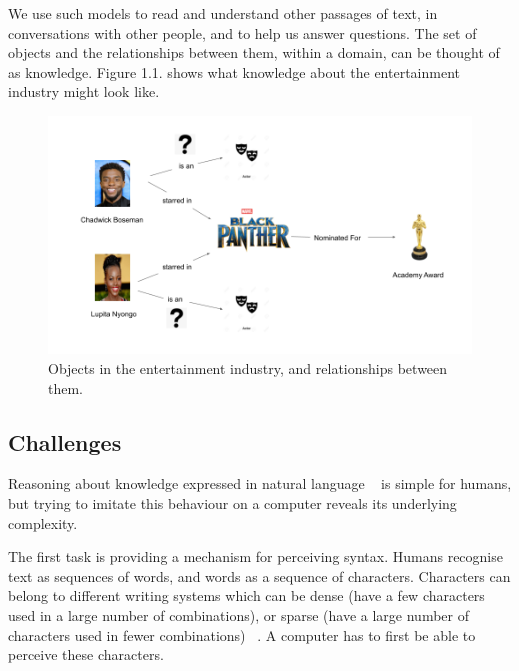 \noindent We use such models to read and understand other passages of text, in conversations with other people, and to help us answer questions. The set of objects and the relationships between them, within a domain, can be thought of as knowledge. Figure 1.1. shows what knowledge about the entertainment industry might look like. \newline

\begin{figure}
   	\centering
    	\includegraphics[width=\textwidth]{Objects_and_the_Relationships_Between_Them}
	\caption{Objects in the entertainment industry, and relationships between them.}
\end{figure}

\subsection{Challenges} 

Reasoning about knowledge expressed in natural language \unskip~\citep{minervini2019differentiable} is simple for humans, but trying to imitate this behaviour on a computer reveals its underlying complexity. \par

\noindent The first task is providing a mechanism for perceiving syntax. Humans recognise text as sequences of words, and words as a sequence of characters. Characters can belong to different writing systems which can be dense (have a few characters used in a large number of combinations), or sparse (have a large number of characters used in fewer combinations) \unskip~\citep{Hua2010}. A computer has to first be able to perceive these characters. \par

